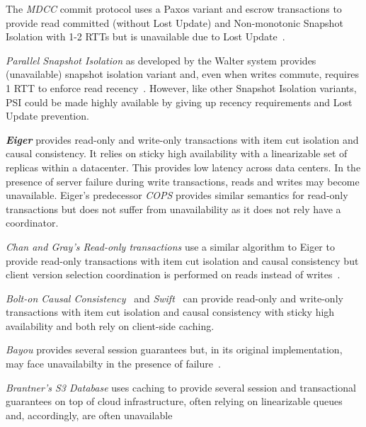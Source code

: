 \vspace{.5em}\noindent The \textit{MDCC} commit protocol uses a Paxos
variant and escrow transactions to provide read committed (without
Lost Update) and Non-monotonic Snapshot Isolation with 1-2 RTTs but is
unavailable due to Lost Update~\cite{mdcc}.

\vspace{.5em}\noindent\textit{Parallel Snapshot Isolation} as
developed by the Walter system provides (unavailable) snapshot
isolation variant and, even when writes commute, requires 1 RTT to
enforce read recency~\cite{walter}. However, like other Snapshot
Isolation variants, PSI could be made highly available by giving up
recency requirements and Lost Update prevention.

\vspace{.5em}\noindent\textit\textbf{Eiger} provides read-only and
write-only transactions with item cut isolation and causal
consistency. It relies on sticky high availability with a linearizable
set of replicas within a datacenter. This provides low latency across
data centers. In the presence of server failure during write
transactions, reads and writes may become unavailable. Eiger's
predecessor \textit{COPS} provides similar semantics for read-only
transactions but does not suffer from unavailability as it does not
rely have a coordinator.

\vspace{.5em}\noindent\textit{Chan and Gray's Read-only transactions}
use a similar algorithm to Eiger to provide read-only transactions
with item cut isolation and causal consistency but client version
selection coordination is performed on reads instead of
writes~\cite{readonly}.

\vspace{.5em}\noindent\textit{Bolt-on Causal
  Consistency}~\cite{bolton} and \textit{Swift}~\cite{swift} can
provide read-only and write-only transactions with item cut isolation
and causal consistency with sticky high availability and both rely on
client-side caching.

\vspace{.5em}\noindent\textit{Bayou} provides several session
guarantees but, in its original implementation, may face unavailabilty
in the presence of failure~\cite{sessionguarantees}.

\vspace{.5em}\noindent\textit{Brantner's S3 Database} uses caching to
provide several session and transactional guarantees on top of cloud
infrastructure, often relying on linearizable queues and, accordingly,
are often unavailable~\cite{kraska-s3}

